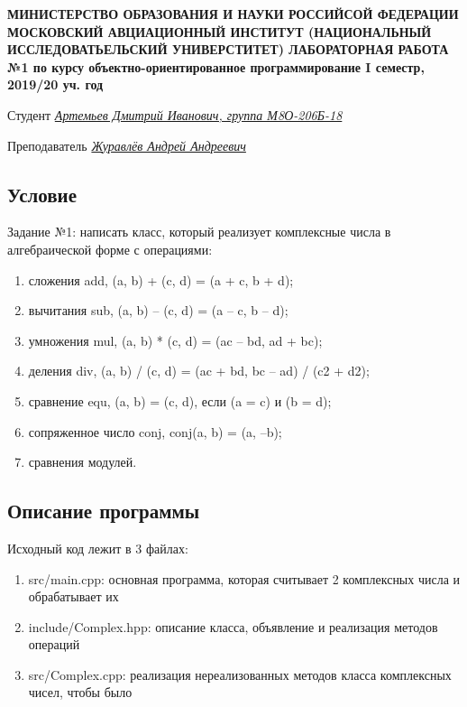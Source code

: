 \documentclass[12pt]{article}
\begin{document}
\begin{titlepage}
\begin{center}
\textbf{МИНИСТЕРСТВО ОБРАЗОВАНИЯ И НАУКИ РОССИЙСОЙ ФЕДЕРАЦИИ
\medskip
МОСКОВСКИЙ АВЦИАЦИОННЫЙ ИНСТИТУТ
(НАЦИОНАЛЬНЫЙ ИССЛЕДОВАТЬЕЛЬСКИЙ УНИВЕРСТИТЕТ)
\vfill\vfill
{\Huge ЛАБОРАТОРНАЯ РАБОТА №1} 
по курсу объектно-ориентированное программирование
I семестр, 2019/20 уч. год}
\end{center}
\vfill

Студент \uline{\it {Артемьев Дмитрий Иванович, группа М8О-206Б-18}\hfill}

Преподаватель \uline{\it {Журавлёв Андрей Андреевич}\hfill}

\vfill
\end{titlepage}

\subsection*{Условие}

Задание №1: написать класс, который реализует комплексные числа в алгебраической форме с операциями: 
\begin{enumerate}
\item сложения add, (a, b) + (c, d) = (a + c, b + d);
\item вычитания sub, (a, b) – (c, d) = (a – c, b – d);
\item умножения mul, (a, b) * (c, d) = (ac – bd, ad + bc);
\item деления div, (a, b) / (c, d) = (ac + bd, bc – ad) / (c2 + d2);
\item сравнение equ, (a, b) = (c, d), если (a = c) и (b = d);
\item сопряженное число conj, conj(a, b) = (a, –b);
\item сравнения модулей.
\end{enumerate}

\subsection*{Описание программы}

Исходный код лежит в 3 файлах:
\begin{enumerate}
\item src/main.cpp: основная программа, которая считывает 2 комплексных числа и обрабатывает их 
\item include/Complex.hpp: описание класса, объявление и реализация методов операций
\item src/Complex.cpp: реализация нереализованных методов класса комплексных чисел, чтобы было
\end{enumerate}
\end{document}
